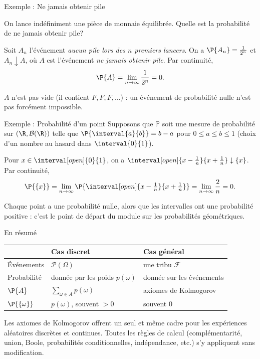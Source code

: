 \documentclass[nuit,charter,pied]{BeamerJS}
\newcommand{\tribu}{\mathcal{F}}
\newcommand{\borel}{\mathcal{B}(\R)}
\begin{document}
\begin{frame}{Exemple : Ne jamais obtenir pile}
	\begin{cadre}
		On lance indéfiniment une pièce de monnaie équilibrée. Quelle est la probabilité de ne jamais obtenir pile?
	\end{cadre}
	\pause
	Soit \(A_n\) l'événement \textit{aucun pile lors des \(n\) premiers lancers}. \pause On a \(\P{A_n}=\frac{1}{2^n}\) et \(A_n\downarrow A\), où \(A\) est l'événement \textit{ne jamais obtenir pile}.
	\pause
	Par continuité,
	\[\P{A}=\lim_{n\to\infty}\frac{1}{2^n}=0.\]
	\pause
	\begin{lumiere}
		\(A\) n'est pas vide (il contient \(F,F,F,\ldots\)) : un événement de probabilité nulle n'est pas forcément impossible.
	\end{lumiere}
\end{frame}

\begin{frame}[t]{Exemple : Probabilité d'un point}
	\pause
	Supposons que \(\mathbb{P}\) soit une mesure de probabilité sur \((\R,\borel)\) telle que \(\P{\interval{a}{b}}=b-a\) pour \(0\leq a\leq b\leq 1\) (choix d'un nombre au hasard dans \(\interval{0}{1}\)).
	\pause
	\medskip

	Pour \(x\in\interval[open]{0}{1}\), on a \(\interval[open]{x-\frac{1}{n}}{x+\frac{1}{n}}\downarrow\{x\}\). \pause Par continuité,
	\[\P{\{x\}}=\lim_{n\to\infty}\P{\interval[open]{x-\tfrac{1}{n}}{x+\tfrac{1}{n}}}=\lim_{n\to\infty}\frac{2}{n}=0.\]
	\pause
	\begin{lumiere}
		Chaque point a une probabilité nulle, alors que les intervalles ont une probabilité positive : c'est le point de départ du module sur les probabilités géométriques.
	\end{lumiere}
\end{frame}

\begin{frame}{En résumé}
\pause
	\begin{center}
	{\small
	\begin{tabular}{|l|l|l|}
		\hline
		 & \textbf{Cas discret} & \textbf{Cas général} \\ \hline
		Événements & \(\mathcal{P}(\Omega)\) & une tribu \(\tribu\) \\ \hline
		Probabilité & donnée par les poids \(p(\omega)\) & donnée sur les événements \\ \hline
		\(\P{A}\) & \(\sum_{\omega\in A}p(\omega)\) & axiomes de Kolmogorov \\ \hline
		\(\P{\{\omega\}}\) & \(p(\omega)\), souvent \(>0\) & souvent \(0\) \\ \hline
	\end{tabular}
	}
	\end{center}
	\pause
	\begin{lumiere}
		Les axiomes de Kolmogorov offrent un seul et même cadre pour les expériences aléatoires discrètes et continues. Toutes les règles de calcul (complémentarité, union, Boole, probabilités conditionnelles, indépendance, etc.) s'y appliquent sans modification.
	\end{lumiere}
\end{frame}
\end{document}
